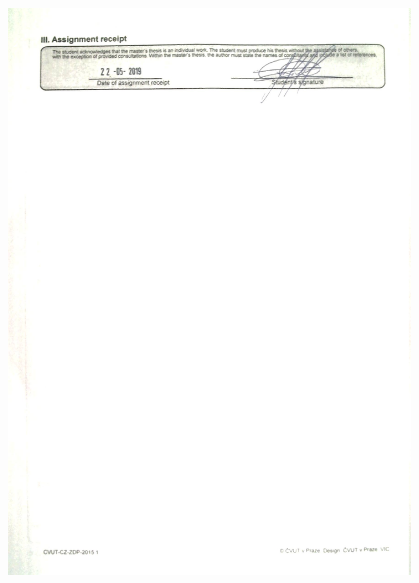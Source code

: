\begin{figure}[!h]
\begin{center}
\includegraphics[width=4.2in]{doc2.jpg}
\end{center}
\end{figure}
